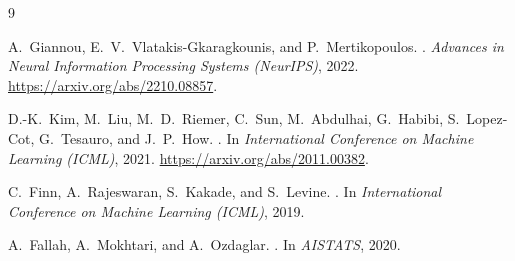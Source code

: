 \documentclass[11pt]{article}
\theoremstyle{definition}
\begin{document}
\begin{thebibliography}{9}

A.~Giannou, E.~V.~Vlatakis-Gkaragkounis, and P.~Mertikopoulos.
.
\newblock \emph{Advances in Neural Information Processing Systems (NeurIPS)},
  2022. \url{https://arxiv.org/abs/2210.08857}.

D.-K.~Kim, M.~Liu, M.~D.~Riemer, C.~Sun, M.~Abdulhai, G.~Habibi, S.~Lopez-Cot,
  G.~Tesauro, and J.~P.~How.
.
\newblock In \emph{International Conference on Machine Learning (ICML)},
  2021. \url{https://arxiv.org/abs/2011.00382}.

C.~Finn, A.~Rajeswaran, S.~Kakade, and S.~Levine.
.
\newblock In \emph{International Conference on Machine Learning (ICML)}, 2019.

A.~Fallah, A.~Mokhtari, and A.~Ozdaglar.
.
\newblock In \emph{AISTATS}, 2020.

\end{thebibliography}
\end{document}
